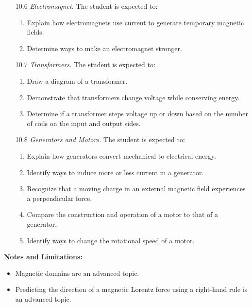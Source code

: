 \documentclass[dvipsnames]{article}
\begin{document}
\begin{enumerate}[topsep=0pt]
    \item[10.6] \textit{Electromagnet.} The student is expected to:
    \begin{enumerate}[topsep=0pt,itemsep=0pt]
        \item Explain how electromagnets use current to generate temporary magnetic fields.
        \item Determine ways to make an electromagnet stronger.
    \end{enumerate}
    \item[10.7] \textit{Transformers.} The student is expected to:
    \begin{enumerate}[topsep=0pt,itemsep=0pt]
        \item Draw a diagram of a transformer.
        \item Demonstrate that transformers change voltage while conserving energy.
        \item Determine if a transformer steps voltage up or down based on the number of coils on the input and output sides.
    \end{enumerate}
    \item[10.8] \textit{Generators and Motors.} The student is expected to:
    \begin{enumerate}[topsep=0pt,itemsep=0pt]
        \item Explain how generators convert mechanical to electrical energy.
        \item Identify ways to induce more or less current in a generator.
        \item Recognize that a moving charge in an external magnetic field experiences a perpendicular force.
        \item Compare the construction and operation of a motor to that of a generator.
        \item Identify ways to change the rotational speed of a motor.
    \end{enumerate}
\end{enumerate}

\textbf{Notes and Limitations:}

\begin{itemize}[topsep=-3pt,itemsep=0pt]
    \item Magnetic domains are an advanced topic.
    \item Predicting the direction of a magnetic Lorentz force using a right-hand rule is an advanced topic.
\end{itemize}
\end{document}
